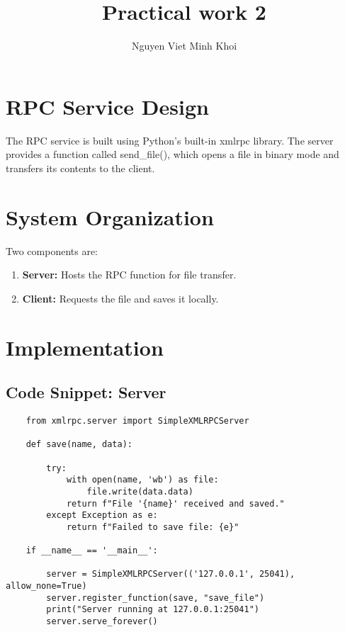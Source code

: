 \documentclass[12pt]{article}
\title{Practical work 2}
\begin{document}
\author{Nguyen Viet Minh Khoi}
\maketitle

\section*{RPC Service Design}
The RPC service is built using Python's built-in xmlrpc library. The server provides a function called send_file(), which opens a file in binary mode and transfers its contents to the client.


\section*{System Organization}
Two components are:
\begin{enumerate}
    \item \textbf{Server:} Hosts the RPC function for file transfer.
    \item \textbf{Client:} Requests the file and saves it locally.
\end{enumerate}


\section*{Implementation}
\subsection*{Code Snippet: Server}
\begin{verbatim}
    from xmlrpc.server import SimpleXMLRPCServer

    def save(name, data):
    
        try:
            with open(name, 'wb') as file:
                file.write(data.data)
            return f"File '{name}' received and saved."
        except Exception as e:
            return f"Failed to save file: {e}"
    
    if __name__ == '__main__':
    
        server = SimpleXMLRPCServer(('127.0.0.1', 25041), allow_none=True)
        server.register_function(save, "save_file")
        print("Server running at 127.0.0.1:25041")
        server.serve_forever()
\end{verbatim}
\end{document}
